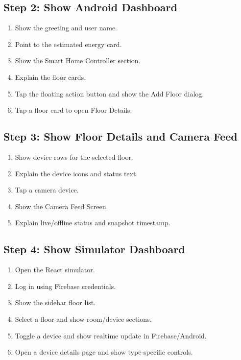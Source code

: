 \documentclass[11pt,a4paper]{article}
\begin{document}
\subsection{Step 2: Show Android Dashboard}
\begin{enumerate}
    \item Show the greeting and user name.
    \item Point to the estimated energy card.
    \item Show the Smart Home Controller section.
    \item Explain the floor cards.
    \item Tap the floating action button and show the Add Floor dialog.
    \item Tap a floor card to open Floor Details.
\end{enumerate}

\subsection{Step 3: Show Floor Details and Camera Feed}
\begin{enumerate}
    \item Show device rows for the selected floor.
    \item Explain the device icons and status text.
    \item Tap a camera device.
    \item Show the Camera Feed Screen.
    \item Explain live/offline status and snapshot timestamp.
\end{enumerate}

\subsection{Step 4: Show Simulator Dashboard}
\begin{enumerate}
    \item Open the React simulator.
    \item Log in using Firebase credentials.
    \item Show the sidebar floor list.
    \item Select a floor and show room/device sections.
    \item Toggle a device and show realtime update in Firebase/Android.
    \item Open a device details page and show type-specific controls.
\end{enumerate}
\end{document}
